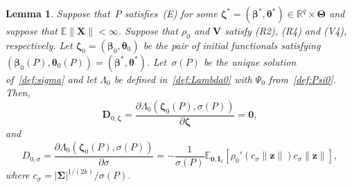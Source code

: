 \documentclass{article}
\numberwithin{equation}{section}
\theoremstyle{plain}
\newtheorem{lemma}{Lemma}
\newcommand{\R}{\mathbb{R}}
\newcommand{\bbeta}{\bm\beta}
\newcommand{\btheta}{\bm\theta}
\newcommand{\bSigma}{\mathbf{\Sigma}}
\newcommand{\bTheta}{\bm\Theta}
\newcommand{\bzeta}{\bm\zeta}
\newcommand{\bz}{\mathbf{z}}
\newcommand{\bX}{\mathbf{X}}
\newcommand{\bV}{\mathbf{V}}
\newcommand{\bI}{\mathbf{I}}
\newcommand{\bD}{\mathbf{D}}
\newcommand{\E}{\mathbb{E}}
\begin{document}
\begin{lemma}
\label{lem:D0zeta=0}
Suppose that~$P$ satisfies~(E) for some $\bzeta^*=(\bbeta^*,\btheta^*)\in\R^q\times\bTheta$
and suppose that $\E\|\bX\|<\infty$.
Suppose that $\rho_0$ and $\bV$ satisfy (R2), (R4) and (V4), respectively.
Let $\bzeta_0=(\bbeta_0,\btheta_0)$ be the pair of initial functionals
satisfying $(\bbeta_0(P),\btheta_0(P))=(\bbeta^*,\btheta^*)$.
Let~$\sigma(P)$ be the unique solution of~\eqref{def:sigma}
and let $\Lambda_0$ be defined in~\eqref{def:Lambda0} with $\Psi_0$ from~\eqref{def:Psi0}.
Then, 
\[
\bD_{0,\bzeta}
=
\frac{\partial\Lambda_0(\bzeta_0(P),\sigma(P))}{\partial\bzeta}
=
\mathbf{0},
\]
and
\[
D_{0,\sigma}
=
\frac{\partial\Lambda_0(\bzeta_{0}(P),\sigma(P))}{\partial\sigma}
=
-\frac{1}{\sigma(P)}
\E_{\mathbf{0},\bI_k}
\left[
\rho_0'
\left(
c_\sigma\|\bz\|
\right)
c_\sigma\|\bz\|
\right],
\]
where $c_\sigma=|\bSigma|^{1/(2k)}/\sigma(P)$.
\end{lemma}
\end{document}
